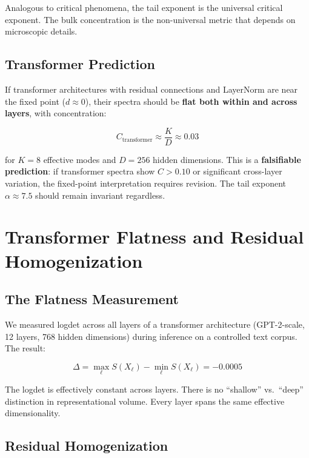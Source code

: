 \documentclass[12pt,a4paper]{article}
\begin{document}
Analogous to critical phenomena, the tail exponent is the universal critical exponent. The bulk concentration is the non-universal metric that depends on microscopic details.

\subsection{Transformer Prediction}

If transformer architectures with residual connections and LayerNorm are near the fixed point ($d \approx 0$), their spectra should be \textbf{flat both within and across layers}, with concentration:

\begin{equation}
C_\text{transformer} \approx \frac{K}{D} \approx 0.03
\end{equation}

for $K = 8$ effective modes and $D = 256$ hidden dimensions. This is a \textbf{falsifiable prediction}: if transformer spectra show $C > 0.10$ or significant cross-layer variation, the fixed-point interpretation requires revision. The tail exponent $\alpha \approx 7.5$ should remain invariant regardless.

\section{Transformer Flatness and Residual Homogenization}
\label{sec:transformer}

\subsection{The Flatness Measurement}

We measured logdet across all layers of a transformer architecture (GPT-2-scale, 12 layers, 768 hidden dimensions) during inference on a controlled text corpus. The result:

\begin{equation}
\Delta = \max_\ell S(X_\ell) - \min_\ell S(X_\ell) = -0.0005
\end{equation}

The logdet is effectively constant across layers. There is no ``shallow'' vs.~``deep'' distinction in representational volume. Every layer spans the same effective dimensionality.

\subsection{Residual Homogenization}
\end{document}
